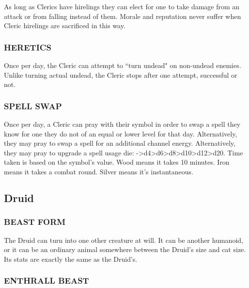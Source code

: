 \documentclass[twoside]{article}
\begin{document}
As long as Clerics have hirelings they can elect for one to take damage from an attack or from falling instead of them. Morale and reputation never suffer when Cleric hirelings are sacrificed in this way.

\subsubsection*{\footnotesize{H}\scriptsize{ERETICS}\normalsize}

Once per day, the Cleric can attempt to ``turn undead" on non-undead enemies. Unlike turning actual undead, the Cleric stops after one attempt, successful or not.

\subsubsection*{\footnotesize{S}\scriptsize{PELL} \footnotesize{S}\scriptsize{WAP}\normalsize}

Once per day, a Cleric can pray with their symbol in order to swap a spell they know for one they do not of an equal or lower level for that day. Alternatively, they may pray to swap a spell for an additional channel energy. Alternatively, they may pray to upgrade a spell usage die: ->d4>d6>d8>d10>d12>d20. Time taken is based on the symbol’s value. Wood means it takes 10 minutes. Iron means it takes a combat round. Silver means it’s instantaneous.

\subsection*{Druid}

\subsubsection*{\footnotesize{B}\scriptsize{EAST} \footnotesize{F}\scriptsize{ORM}\normalsize}

The Druid can turn into one other creature at will. It can be another humanoid, or it can be an ordinary animal somewhere between the Druid's size and cat size. Its stats are exactly the same as the Druid's. 

\subsubsection*{\footnotesize{E}\scriptsize{NTHRALL} \footnotesize{B}\scriptsize{EAST}\normalsize}
\end{document}
